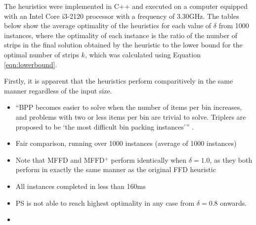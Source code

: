 \documentclass[oribibl]{llncs}
\begin{document}
The heuristics were implemented in C++ and executed on a computer equipped with an Intel Core i3-2120 processor with a frequency of 3.30GHz. The tables below show the average optimality of the heuristics for each value of $\delta$ from 1000 instances, where the optimality of each instance is the ratio of the number of strips in the final solution obtained by the heuristic to the lower bound for the optimal number of strips $k$, which was calculated using Equation \ref{eqn:lowerbound}. 

Firstly, it is apparent that the heuristics perform comparitively in the same manner regardless of the input size. 

\begin{itemize}
	\item ``BPP becomes easier to solve when the number of items per bin increases, and problems with two or less items per bin are trivial to solve. Triplers are proposed to be `the most difficult bin packing instances''' \cite{falkenauer1996}.
	\item Fair comparison, running over 1000 instances (average of 1000 instances)
	\item Note that MFFD and MFFD$^+$ perform identically when $\delta = 1.0$, as they both perform in exactly the same manner as the original FFD heuristic  
	\item All instances completed in less than 160ms
	\item PS is not able to reach highest optimality in any case from $\delta = 0.8$ onwards.
	\item 
\end{itemize}
\end{document}
